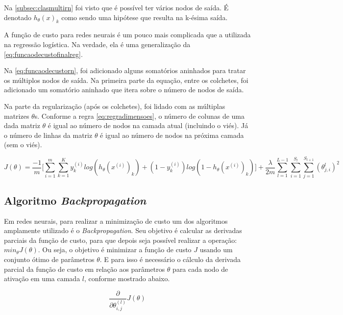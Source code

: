 Na \autoref{subsec:clasmultirn} foi visto que é possível ter vários nodos de saída. É denotado $h_{\theta}(x)_k$ como sendo uma hipótese que resulta na k-ésima saída.

A função de custo para redes neurais é um pouco mais complicada que a utilizada na regressão logística. Na verdade, ela é uma generalização da \autoref{eq:funcaodecustofinalreg}. 

Na \autoref{eq:funcaodecustorn}, foi adicionado alguns somatórios aninhados para tratar os múltiplos nodos de saída. Na primeira parte da equação, entre os colchetes, foi adicionado um somatório aninhado que itera sobre o número de nodos de saída.

Na parte da regularização (após os colchetes), foi lidado com as múltiplas matrizes $\theta$s. Conforme a regra \ref{eq:regradimensoes}, o número de colunas de uma dada matriz $\theta$ é igual ao número de nodos na camada atual (incluindo o viés). Já o número de linhas da matriz $\theta$ é igual ao número de nodos na próxima camada (sem o viés). 

\begin{equation}\label{eq:funcaodecustorn}
J(\theta) = \frac{-1}{m}\Big[ \sum\limits_{i=1}^m \sum\limits_{k=1}^K y_k^{(i)}log(h_{\theta}(x^{(i)})_k) + (1 - y_k^{(i)})log(1 - h_{\theta}(x^{(i)})_k) \Big] +
\frac{\lambda}{2m} 
\sum\limits_{l=1}^{L-1}
\sum\limits_{i=1}^{S_l}
\sum\limits_{j=1}^{S_{l+1}} (\theta_{j,i}^{l})^2
\end{equation}


\subsection{Algoritmo \textit{Backpropagation}}

Em redes neurais, para realizar a minimização de custo um dos algoritmos amplamente utilizado é o \textit{Backpropagation}. Seu objetivo é calcular as derivadas parciais da função de custo, para que depois seja possível realizar a operação: $min_{\theta}J(\theta)$. Ou seja, o objetivo é minimizar a função de custo $J$ usando um conjunto ótimo de parâmetros $\theta$. E para isso é necessário o cálculo da derivada parcial da função de custo em relação aos parâmetros $\theta$ para cada nodo de ativação em uma camada $l$, conforme mostrado abaixo.

\begin{equation}
\frac{\partial}{\partial\theta_{i,j}^{(l)}} J(\theta) \nonumber
\end{equation}


